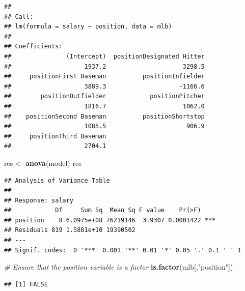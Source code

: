 \documentclass[
]{article}
\newenvironment{Shaded}{\begin{snugshade}}{\end{snugshade}}
\newcommand{\CommentTok}[1]{\textcolor[rgb]{0.56,0.35,0.01}{\textit{#1}}}
\newcommand{\DecValTok}[1]{\textcolor[rgb]{0.00,0.00,0.81}{#1}}
\newcommand{\FloatTok}[1]{\textcolor[rgb]{0.00,0.00,0.81}{#1}}
\newcommand{\FunctionTok}[1]{\textcolor[rgb]{0.13,0.29,0.53}{\textbf{#1}}}
\newcommand{\NormalTok}[1]{#1}
\newcommand{\OtherTok}[1]{\textcolor[rgb]{0.56,0.35,0.01}{#1}}
\newcommand{\SpecialCharTok}[1]{\textcolor[rgb]{0.81,0.36,0.00}{\textbf{#1}}}
\newcommand{\StringTok}[1]{\textcolor[rgb]{0.31,0.60,0.02}{#1}}
\begin{document}
\begin{verbatim}
## 
## Call:
## lm(formula = salary ~ position, data = mlb)
## 
## Coefficients:
##               (Intercept)  positionDesignated Hitter  
##                    1937.2                     3298.5  
##     positionFirst Baseman          positionInfielder  
##                    3889.3                    -1166.6  
##        positionOutfielder            positionPitcher  
##                    1816.7                     1062.0  
##    positionSecond Baseman          positionShortstop  
##                    1085.5                      906.9  
##     positionThird Baseman  
##                    2704.1
\end{verbatim}

\begin{Shaded}
\begin{Highlighting}[]
\NormalTok{res }\OtherTok{\textless{}{-}} \FunctionTok{anova}\NormalTok{(model)}
\NormalTok{res}
\end{Highlighting}
\end{Shaded}

\begin{verbatim}
## Analysis of Variance Table
## 
## Response: salary
##            Df     Sum Sq  Mean Sq F value    Pr(>F)    
## position    8 6.0975e+08 76219146  3.9307 0.0001422 ***
## Residuals 819 1.5881e+10 19390502                      
## ---
## Signif. codes:  0 '***' 0.001 '**' 0.01 '*' 0.05 '.' 0.1 ' ' 1
\end{verbatim}

\begin{Shaded}
\begin{Highlighting}[]
\CommentTok{\# Ensure that the position variable is a factor}
\FunctionTok{is.factor}\NormalTok{(mlb[,}\StringTok{"position"}\NormalTok{])}
\end{Highlighting}
\end{Shaded}

\begin{verbatim}
## [1] FALSE
\end{verbatim}

\begin{Shaded}
\end{Shaded}
\end{document}

